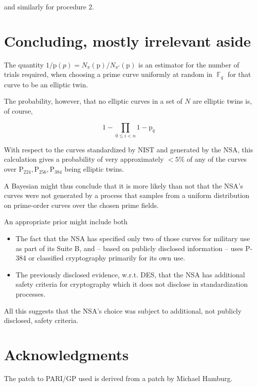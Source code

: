 \documentclass[11pt,fleqn]{article}
\newcommand{\p}{\ensuremath{\mathup{p}} }
\newcommand{\Pa}{\ensuremath{\mathup{P}_{224}} }
\newcommand{\Pb}{\ensuremath{\mathup{P}_{256}} }
\newcommand{\Pc}{\ensuremath{\mathup{P}_{384}} }
\begin{document}
and similarly for procedure 2.

\section{Concluding, mostly irrelevant aside}

The quantity $1 / \p(p) = N_{\pi}(\p) / N_{\pi'}(\p)$ is an estimator for
the number of trials required, when choosing a prime curve uniformly at
random in $\BbbF_q$ for that curve to be an elliptic twin.

The probability, however, that no elliptic curves in a set of $N$
are elliptic twins is, of course,

\begin{equation}
1 - \prod_{0 \leq i < n} 1 - \p_q
\end{equation}

With respect to the curves standardized by NIST and generated by the
NSA, this calculation gives a probability of very approximately $< 5\%$
of any of the curves over $\Pa, \Pb, \Pc$ being elliptic twins.

A Bayesian might thus conclude that it is more likely than not that
the NSA's curves were not generated by a process that samples from
a uniform distribution on prime-order curves over the chosen prime fields.

An appropriate prior might include both

\begin{itemize}

\item The fact that the NSA has specified only two of those curves for
military use as part of its Suite B, and -- based on publicly disclosed
information -- uses P-384 or classified cryptography primarily for its
own use.

\item The previously disclosed evidence, w.r.t. DES, that the NSA has
additional safety criteria for cryptography which it does not disclose
in standardization processes.

\end{itemize}

All this suggests that the NSA's choice was subject to additional, not
publicly disclosed, safety criteria.

\section{Acknowledgments}

The patch to PARI/GP used is derived from a patch by Michael Hamburg.
\end{document}
